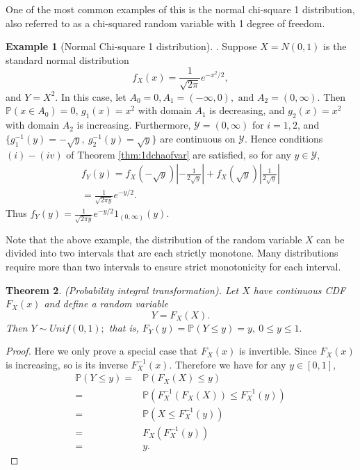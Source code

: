 \documentclass{article}
\theoremstyle{plain}
\newtheorem{thm}{Theorem}[section]
\theoremstyle{definition}
\newtheorem{exa}[thm]{Example}
\begin{document}
One of the most common examples of this is the normal chi-square 1 distribution, also referred to as a chi-squared random variable with 1 degree of freedom. 

\begin{exa}[Normal Chi-square 1 distribution]
    . Suppose $X = N(0,1)$ is the standard normal distribution $$f_X(x) = \frac{1}{\sqrt{2\pi}}e^{-x^2/2},$$ and $Y = X^2.$
    In this case, let $A_0 = {0}, A_1 = (-\infty,0), \text{ and } A_2 = (0,\infty)$.
    Then $\mathbb{P}(x \in A_0) = 0$, $g_1(x) = x^2 $ with domain $A_1$ is decreasing, and $g_2(x) = x^2 $ with domain $A_2$ is increasing. Furthermore, $\mathcal{Y} = (0,\infty)$ for $i = 1, 2$, and $\{g_1^{-1}(y) = -\sqrt{y}, \ g_2^{-1}(y) = \sqrt{y}\}$ are continuous on $\mathcal{Y}.$ Hence conditions $(i)-(iv)$ of Theorem \ref{thm:1dchaofvar} are satisfied, so for any $y\in \mathcal{Y}$,
   \begin{align*}
       f_Y(y) = f_X(-\sqrt{y})\left|-\frac{1}{2\sqrt{y}}\right| + f_X(\sqrt{y})\left|\frac{1}{2\sqrt{y}}\right| \\ 
       = \frac{1}{\sqrt{2\pi y}}e^{-y/2} .
   \end{align*}
   Thus $f_Y(y) = \frac{1}{\sqrt{2\pi y}}e^{-y/2} 1_{(0,\infty)}(y) $. 
\end{exa}

Note that the above example, the distribution of the random variable $X$ can be divided into two intervals that are each strictly monotone. Many distributions require more than two intervals to ensure strict monotonicity for each interval.


\begin{thm}
    (Probability integral transformation). Let $X$ have continuous CDF $F_X(x)$ and define a random variable $$Y = F_X(X).$$ Then $Y \sim Unif(0,1);$ that is, $F_Y(y) = \mathbb{P}(Y \le y) = y, \ 0 \le y \le 1.$
\end{thm}

\begin{proof}
    Here we only prove a special case that $F_X(x)$ is invertible. Since $F_X(x)$ is increasing, so is its inverse $F_X^{-1}(x)$. Therefore we have for any $y\in [0,1]$,
    \begin{align*}
        \mathbb{P}(Y \le y) = & \mathbb{P}(F_X(X) \le y) \\ 
        = & \mathbb{P}(F_X^{-1}(F_X(X)) \le F_X^{-1}(y)) \\
        =& \mathbb{P}(X \le F_X^{-1}(y)) \\
        = & F_X(F_X^{-1}(y)) \\ 
        = & y. 
    \end{align*}
\end{proof}
\end{document}
